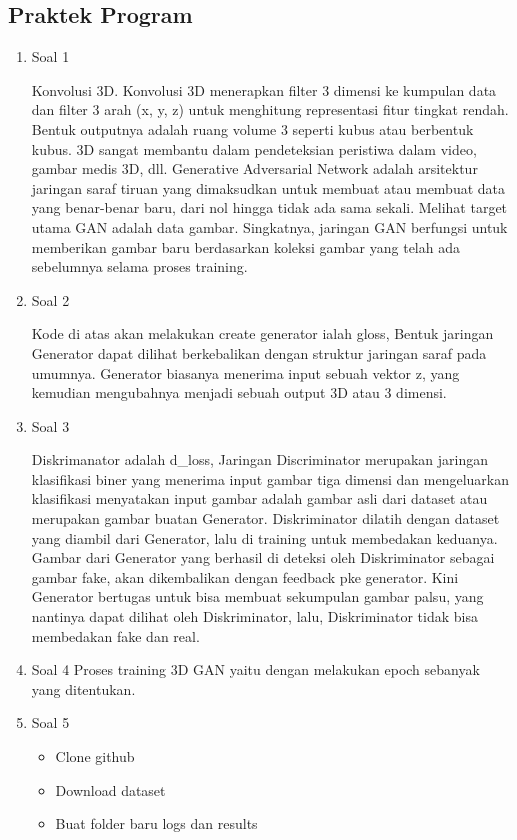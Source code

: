 \subsection{Praktek Program}
\begin{enumerate}
	\item Soal 1
	\hfill\break

	Konvolusi 3D. Konvolusi 3D menerapkan filter 3 dimensi ke kumpulan data dan filter 3 arah (x, y, z) untuk menghitung representasi fitur tingkat rendah. Bentuk outputnya adalah ruang volume 3 seperti kubus atau berbentuk kubus. 3D sangat membantu dalam pendeteksian peristiwa dalam video, gambar medis 3D, dll. Generative Adversarial Network adalah arsitektur jaringan saraf tiruan yang dimaksudkan untuk membuat atau membuat data yang benar-benar baru, dari nol hingga tidak ada sama sekali. Melihat target utama GAN adalah data gambar. Singkatnya, jaringan GAN berfungsi untuk memberikan gambar baru berdasarkan koleksi gambar yang telah ada sebelumnya selama proses training.

	\item Soal 2
	\hfill\break
	
	Kode di atas akan melakukan create generator ialah gloss, Bentuk jaringan Generator dapat dilihat berkebalikan dengan struktur jaringan saraf pada umumnya. Generator biasanya menerima input sebuah vektor z, yang kemudian mengubahnya menjadi sebuah output 3D atau 3 dimensi.

	\item Soal 3
	\hfill\break
	
	Diskrimanator adalah d\_loss, Jaringan Discriminator merupakan jaringan klasifikasi biner yang menerima input gambar tiga dimensi dan mengeluarkan klasifikasi menyatakan input gambar adalah gambar asli dari dataset atau merupakan gambar buatan Generator. Diskriminator dilatih dengan dataset yang diambil dari Generator, lalu di training untuk membedakan keduanya. Gambar dari Generator yang berhasil di deteksi oleh Diskriminator sebagai gambar fake, akan dikembalikan dengan feedback pke generator. Kini Generator bertugas untuk bisa membuat sekumpulan gambar palsu, yang nantinya dapat dilihat oleh Diskriminator, lalu, Diskriminator tidak bisa membedakan fake dan real.

	\item Soal 4
	\hfill\break
	Proses training 3D GAN yaitu dengan melakukan epoch sebanyak yang ditentukan.

	\item Soal 5
	\hfill\break
	\begin{itemize}
		\item Clone github
		\item Download dataset
		\item Buat folder baru logs dan results
	\end{itemize}


\end{enumerate}
